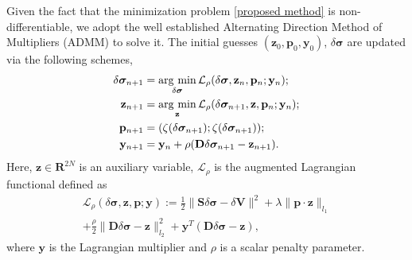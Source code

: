 \documentclass[lettersize,journal]{IEEEtran}
\begin{document}
Given the fact that the minimization problem \eqref{proposed method} is non-differentiable, we adopt the well established Alternating Direction Method of Multipliers (ADMM) \cite{Boyd2011} to solve it. The initial guesses $(\mathbf{z}_0,\mathbf{p}_0,\mathbf{y}_0)$, $\delta\bm{\sigma}$ are updated via the following schemes,
\begin{subequations}
\begin{align}
\label{a5}
\delta\bm{\sigma}_{n+1}&=\mathop{{\rm arg\ min}}\limits_{\delta\bm{\sigma}}\mathcal{L}_{\rho}(\delta\bm{\sigma}, \mathbf{z}_{n}, \mathbf{p}_{n}; \mathbf{y}_{n});\\
\label{a6}
\mathbf{z}_{n+1}&=\mathop{{\rm arg\ min}}\limits_{\mathbf{z}}\mathcal{L}_{\rho}(\delta\bm{\sigma}_{n+1}, \mathbf{z}, \mathbf{p}_{n}; \mathbf{y}_{n});\\
\label{a7}
 \mathbf{p}_{n+1}&=(\zeta(\delta\bm{\sigma}_{n+1});\zeta(\delta\bm{\sigma}_{n+1}));\\
\label{a8}
\mathbf{y}_{n+1}&=\mathbf{y}_{n}+\rho(\mathbf{D}\delta\bm{\sigma}_{n+1}-\mathbf{z}_{n+1}).
\end{align}
\end{subequations}
Here, $\mathbf{z}\in \mathbf{R}^{2N}$ is an auxiliary variable, $\mathcal{L}_\rho$ is the augmented Lagrangian functional defined as
\begin{equation*}\label{Lagrangian functional 1}
\begin{split}
\mathcal{L}_{\rho}(\delta\bm{\sigma}, \mathbf{z}, \mathbf{p}; \mathbf{y}):=\frac{1}{2}\|\mathbf{S}\delta\bm{\sigma}-\delta \mathbf{V}\|^{2}+\lambda\|\mathbf{p}\cdot \mathbf{z}\|_{{l_1}}\\
+\frac{\rho}{2}\|\mathbf{D}\delta\bm{\sigma}-\mathbf{z}\|_{l_2}^{2}+\mathbf{y}^{T}(\mathbf{D}\delta\bm{\sigma} - \mathbf{z}),
\end{split}
\end{equation*}
where $\mathbf{y}$ is the Lagrangian multiplier and $\rho$ is a scalar penalty parameter.
\end{document}
